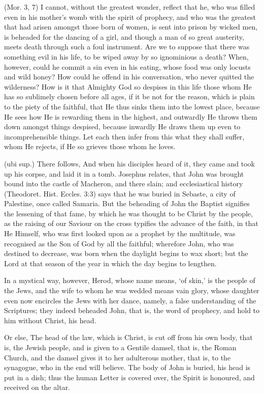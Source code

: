  (Mor. 3, 7) I cannot, without the greatest wonder, reflect that he, who was filled even in his mother’s womb with the spirit of prophecy, and who was the greatest that had arisen amongst those born of women, is sent into prison by wicked men, is beheaded for the dancing of a girl, and though a man of so great austerity, meets death through such a foul instrument. Are we to suppose that there was something evil in his life, to be wiped away by so ignominious a death? When, however, could he commit a sin even in his eating, whose food was only locusts and wild honey? How could he offend in his conversation, who never quitted the wilderness? How is it that Almighty God so despises in this life those whom He has so sublimely chosen before all ages, if it be not for the reason, which is plain to the piety of the faithful, that He thus sinks them into the lowest place, because He sees how He is rewarding them in the highest, and outwardly He throws them down amongst things despised, because inwardly He draws them up even to incomprehensible things. Let each then infer from this what they shall suffer, whom He rejects, if He so grieves those whom he loves.

 (ubi sup.) There follows, And when his disciples heard of it, they came and took up his corpse, and laid it in a tomb. Josephus relates, that John was brought bound into the castle of Macheron, and there slain; and ecclesiastical history (Theodoret. Hist. Eccles. 3:3) says that he was buried in Sebaste, a city of Palestine, once called Samaria. But the beheading of John the Baptist signifies the lessening of that fame, by which he was thought to be Christ by the people, as the raising of our Saviour on the cross typifies the advance of the faith, in that He Himself, who was first looked upon as a prophet by the multitude, was recognised as the Son of God by all the faithful; wherefore John, who was destined to decrease, was born when the daylight begins to wax short; but the Lord at that season of the year in which the day begins to lengthen.

 In a mystical way, however, Herod, whose name means, ‘of skin,’ is the people of the Jews, and the wife to whom he was wedded means vain glory, whose daughter even now encircles the Jews with her dance, namely, a false understanding of the Scriptures; they indeed beheaded John, that is, the word of prophecy, and hold to him without Christ, his head.

 Or else, The head of the law, which is Christ, is cut off from his own body, that is, the Jewish people, and is given to a Gentile damsel, that is, the Roman Church, and the damsel gives it to her adulterous mother, that is, to the synagogue, who in the end will believe. The body of John is buried, his head is put in a dish; thus the human Letter is covered over, the Spirit is honoured, and received on the altar.

